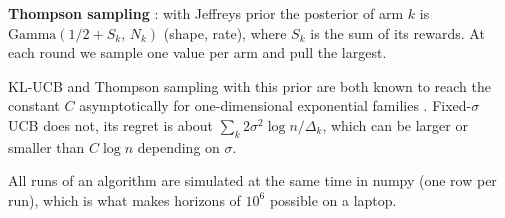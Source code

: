 \textbf{Thompson sampling} \cite{korda2013}: with Jeffreys prior the posterior of arm $k$ is $\mathrm{Gamma}(1/2 + S_k,\, N_k)$ (shape, rate), where $S_k$ is the sum of its rewards. At each round we sample one value per arm and pull the largest.

KL-UCB and Thompson sampling with this prior are both known to reach the constant $C$ asymptotically for one-dimensional exponential families \cite{cappe2013, korda2013}. Fixed-$\sigma$ UCB does not, its regret is about $\sum_k 2\sigma^2 \log n / \Delta_k$, which can be larger or smaller than $C\log n$ depending on $\sigma$.

All runs of an algorithm are simulated at the same time in numpy (one row per run), which is what makes horizons of $10^6$ possible on a laptop.
